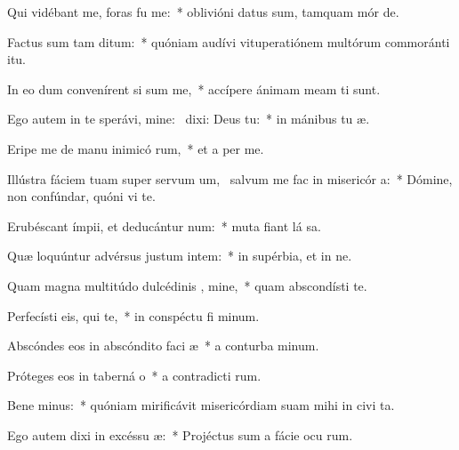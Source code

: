\item Qui vidébant me, foras fu  me:~* oblivióni datus sum, tamquam mór  de.
\item Factus sum tam  ditum:~* quóniam audívi vituperatiónem multórum commoránti  itu.
\item In eo dum convenírent si sum me,~* accípere ánimam meam ti sunt.
\item Ego autem in te sperávi, mine:~\pscross{} dixi: Deus   tu:~* in mánibus tu  æ.
\item Eripe me de manu inimicó rum,~* et a per me.
\item Illústra fáciem tuam super servum um,~\pscross{} salvum me fac in misericór a:~* Dómine, non confúndar, quóni vi te.
\item Erubéscant ímpii, et deducántur  num:~* muta fiant lá sa.
\item Quæ loquúntur advérsus justum intem:~* in supérbia, et in ne.
\item Quam magna multitúdo dulcédinis , mine,~* quam abscondísti  te.
\item Perfecísti eis, qui   te,~* in conspéctu fi minum.
\item Abscóndes eos in abscóndito faci æ~* a conturba minum.
\item Próteges eos in taberná o~* a contradicti rum.
\item Bene minus:~* quóniam mirificávit misericórdiam suam mihi in civi ta.
\item Ego autem dixi in excéssu  æ:~* Projéctus sum a fácie ocu rum.
